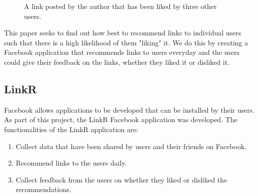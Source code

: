 \begin{figure}[h]
\centering

\caption{A link posted by the author that has been liked by three other users.}
\end{figure}

This paper seeks to find out how best to recommend links to individual users such that there is a high likelihood of them "liking" it. We do this by creating a Facebook application that recommends links to users everyday and the users could give their feedback on the links, whether they liked it or disliked it. 

\subsection{LinkR}
Facebook allows applications to be developed that can be installed by their users. As part of this project, the LinkR Facebook application was developed. The functionalities of the LinkR application are:

\begin{enumerate}
\item{Collect data that have been shared by users and their friends on Facebook.}
\item{Recommend links to the users daily.}
\item{Collect feedback from the users on whether they liked or disliked the recommendations.}
\end{enumerate}

